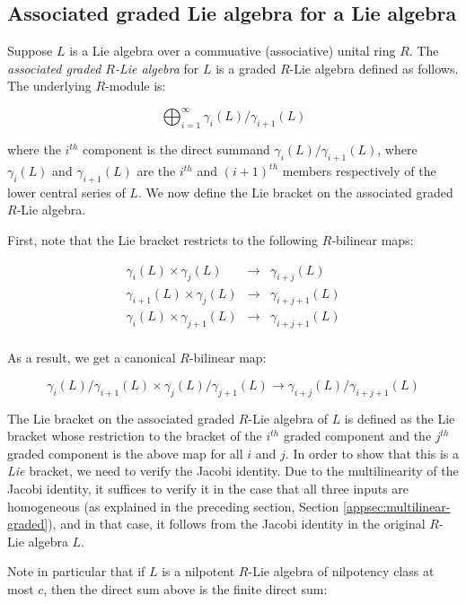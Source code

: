 \subsection{Associated graded Lie algebra for a Lie algebra}

Suppose $L$ is a Lie algebra over a commuative (associative) unital
ring $R$. The {\em associated graded $R$-Lie algebra} for $L$ is a
graded $R$-Lie algebra defined as follows. The underlying $R$-module
is:

$$\bigoplus_{i=1}^\infty \gamma_i(L)/\gamma_{i+1}(L)$$

where the $i^{th}$ component is the direct summand
$\gamma_i(L)/\gamma_{i+1}(L)$, where $\gamma_i(L)$ and
$\gamma_{i+1}(L)$ are the $i^{th}$ and $(i+1)^{th}$ members
respectively of the lower central series of $L$. We now define the Lie
bracket on the associated graded $R$-Lie algebra.

First, note that the Lie bracket restricts to the following
$R$-bilinear maps:

\begin{eqnarray*}
  \gamma_i(L) \times \gamma_j(L) & \to & \gamma_{i+j}(L)\\
  \gamma_{i+1}(L) \times \gamma_j(L) & \to & \gamma_{i+j+1}(L)\\
  \gamma_i(L) \times \gamma_{j+1}(L) & \to & \gamma_{i+j+1}(L)\\
\end{eqnarray*}

As a result, we get a canonical $R$-bilinear map:

$$\gamma_i(L)/\gamma_{i+1}(L) \times \gamma_j(L)/\gamma_{j+1}(L) \to \gamma_{i+j}(L)/\gamma_{i+j+1}(L)$$

The Lie bracket on the associated graded $R$-Lie algebra of $L$ is
defined as the Lie bracket whose restriction to the bracket of the
$i^{th}$ graded component and the $j^{th}$ graded component is the
above map for all $i$ and $j$. In order to show that this is a {\em
  Lie} bracket, we need to verify the Jacobi identity. Due to the
multilinearity of the Jacobi identity, it suffices to verify it in the
case that all three inputs are homogeneous (as explained in the
preceding section, Section \ref{appsec:multilinear-graded}), and in
that case, it follows from the Jacobi identity in the original $R$-Lie
algebra $L$.

Note in particular that if $L$ is a nilpotent $R$-Lie algebra of
nilpotency class at most $c$, then the direct sum above is the finite
direct sum:

